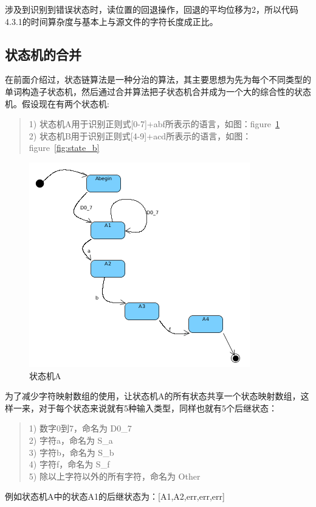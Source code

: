 涉及到识别到错误状态时，读位置的回退操作，回退的平均位移为2，所以代码4.3.1的时间算杂度与基本上与源文件的字符长度成正比。
  
\subsection{状态机的合并}
在前面介绍过，状态链算法是一种分治的算法，其主要思想为先为每个不同类型的单词构造子状态机，然后通过合并算法把子状态机合并成为一个大的综合性的状态机。假设现在有两个状态机:
\begin{quote}
1) 状态机A用于识别正则式[0-7]+abf所表示的语言，如图：figure~\ref{fig:state_a}\\
2) 状态机B用于识别正则式[4-9]+acd所表示的语言，如图：figure~\ref{fig:state_b}
\end{quote}
\begin{figure}
 \centering
 \includegraphics[scale=1]{s_a.png}
 \caption{状态机A}
 \label{fig:state_a}
\end{figure}
为了减少字符映射数组的使用，让状态机A的所有状态共享一个状态映射数组，这样一来，对于每个状态来说就有5种输入类型，同样也就有5个后继状态：
\begin{quote}
1) 数字0到7，命名为 D0\_7  \\
2) 字符a，命名为 S\_a  \\
3) 字符b，命名为 S\_b \\
4) 字符f，命名为 S\_f \\
5) 除以上字符以外的所有字符，命名为 Other
\end{quote}
例如状态机A中的状态A1的后继状态为：[A1,A2,err,err,err] 

